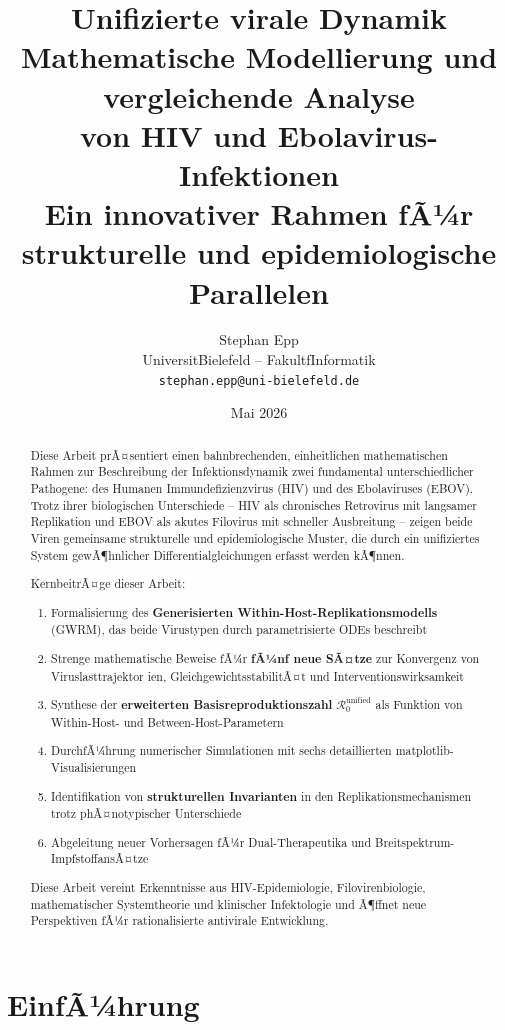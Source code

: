 ﻿\documentclass[a4paper,12pt]{article}
\title{\textbf{Unifizierte virale Dynamik}\\[0.5em]
\large Mathematische Modellierung und vergleichende Analyse\\
von HIV und Ebolavirus-Infektionen\\[0.5em]
\normalsize Ein innovativer Rahmen fÃ¼r strukturelle und epidemiologische Parallelen}
\author{Stephan Epp\\
\small Universit\at Bielefeld -- Fakult\at f\ur Informatik\\
\small \texttt{stephan.epp@uni-bielefeld.de}}
\date{Mai 2026}
\theoremstyle{definition}
\begin{document}
\maketitle

\begin{abstract}
Diese Arbeit prÃ¤sentiert einen bahnbrechenden, einheitlichen mathematischen Rahmen zur Beschreibung der Infektionsdynamik zwei fundamental unterschiedlicher Pathogene: des Humanen Immundefizienzvirus (HIV) und des Ebolaviruses (EBOV). Trotz ihrer biologischen Unterschiede -- HIV als chronisches Retrovirus mit langsamer Replikation und EBOV als akutes Filovirus mit schneller Ausbreitung -- zeigen beide Viren gemeinsame strukturelle und epidemiologische Muster, die durch ein unifiziertes System gewÃ¶hnlicher Differentialgleichungen erfasst werden kÃ¶nnen.

KernbeitrÃ¤ge dieser Arbeit:
\begin{enumerate}
\item Formalisierung des \textbf{Generisierten Within-Host-Replikationsmodells} (GWRM), das beide Virustypen durch parametrisierte ODEs beschreibt
\item Strenge mathematische Beweise fÃ¼r \textbf{fÃ¼nf neue SÃ¤tze} zur Konvergenz von Viruslasttrajektor ien, GleichgewichtsstabilitÃ¤t und Interventionswirksamkeit
\item Synthese der \textbf{erweiterten Basisreproduktionszahl} $\mathcal{R}_0^\text{unified}$ als Funktion von Within-Host- und Between-Host-Parametern
\item DurchfÃ¼hrung numerischer Simulationen mit sechs detaillierten matplotlib-Visualisierungen
\item Identifikation von \textbf{strukturellen Invarianten} in den Replikationsmechanismen trotz phÃ¤notypischer Unterschiede
\item Abgeleitung neuer Vorhersagen fÃ¼r Dual-Therapeutika und Breitspektrum-ImpfstoffansÃ¤tze
\end{enumerate}

Diese Arbeit vereint Erkenntnisse aus HIV-Epidemiologie, Filovirenbiologie, mathematischer Systemtheorie und klinischer Infektologie und Ã¶ffnet neue Perspektiven fÃ¼r rationalisierte antivirale Entwicklung.
\end{abstract}

\newpage
\tableofcontents
\newpage

\section{EinfÃ¼hrung}
\end{document}

